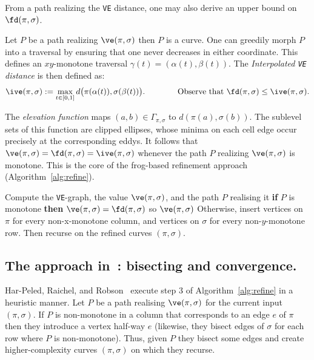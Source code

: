 \documentclass[english, thm-restate, notab]{lipics-v2021}
\begin{document}
\noindent
From a path realizing the \texttt{VE} distance, one may also derive an upper bound on $\fd(\pi, \sigma)$.

\begin{definition}
    Let $P$ be a path realizing $\ve(\pi,\sigma)$ then $P$ is a curve. One can greedily morph $P$ into a traversal by ensuring that one never decreases in either coordinate. This defines an $xy$-monotone traversal $\gamma(t) = (\alpha(t), \beta(t))$.
    The \emph{Interpolated \texttt{VE} distance} is then defined as:
    \[
        \ive(\pi, \sigma)
        := \max_{t \in [0,1]} d\bigl(\pi(\alpha(t)), \sigma(\beta(t))\bigr).
        \qquad\qquad
        \text{Observe that } \fd(\pi,\sigma) \le \ive(\pi,\sigma).
    \]
\end{definition}

The \emph{elevation function} maps $(a,b) \in \Gamma_{\pi, \sigma}$ to $d(\pi(a), 
\sigma(b))$.
The sublevel sets of this function are clipped ellipses, whose minima on each cell edge occur precisely at the corresponding eddys.
It follows that $\ve(\pi,\sigma) = \fd(\pi, \sigma) = \ive(\pi, \sigma) $ whenever the path $P$ realizing $\ve(\pi,\sigma)$ is monotone.
This is the core of the frog-based refinement approach (Algorithm~\ref{alg:refine}).


\begin{algorithm}[H]
\caption{Refinement Procedure from~\cite{harpeled_et_al:LIPIcs.SoCG.2025.54}}
\label{alg:refine}
\begin{algorithmic}[1]
  \State Compute the \texttt{VE}-graph, the value $\ve(\pi,\sigma)$, and the path $P$ realising it
  \State \textbf{if} $P$ is monotone \textbf{then} $\ve(\pi,\sigma) = \fd(\pi, \sigma)$ so \Return $\ve(\pi,\sigma)$
  \State Otherwise, insert vertices on $\pi$ for every non-x-monotone column, and vertices on $\sigma$ for every non-$y$-monotone row. Then recurse on the refined curves $(\pi,\sigma)$.
\end{algorithmic}
\end{algorithm}

\subsection{The approach in~\cite{harpeled_et_al:LIPIcs.SoCG.2025.54}: bisecting and convergence.}
Har-Peled, Raichel, and Robson~\cite{harpeled_et_al:LIPIcs.SoCG.2025.54} execute step 3 of Algorithm~\ref{alg:refine} in a heuristic manner.  
Let $P$ be a path realising $\ve(\pi, \sigma)$ for the current input $(\pi, \sigma)$. 
If $P$ is non-monotone in a column that corresponds to an edge $e$ of $\pi$ then they introduce a vertex half-way $e$ (likewise, they bisect edges of $\sigma$ for each row where $P$ is non-monotone). 
Thus, given $P$ they bisect some edges and create higher-complexity curves $(\pi, \sigma)$ on which they recurse.
\end{document}
